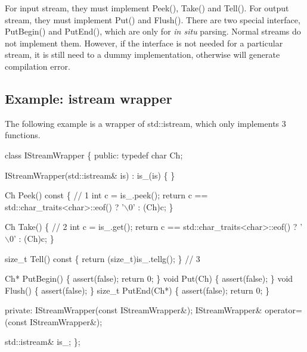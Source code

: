 For input stream, they must implement {\ttfamily Peek()}, {\ttfamily Take()} and {\ttfamily Tell()}. For output stream, they must implement {\ttfamily Put()} and {\ttfamily Flush()}. There are two special interface, {\ttfamily Put\+Begin()} and {\ttfamily Put\+End()}, which are only for {\itshape in situ} parsing. Normal streams do not implement them. However, if the interface is not needed for a particular stream, it is still need to a dummy implementation, otherwise will generate compilation error.\hypertarget{md_Cadriciel_Commun_Externe_RapidJSON_doc_stream.zh-cn_ExampleIStreamWrapper}{}\subsection{Example\+: istream wrapper}\label{md_Cadriciel_Commun_Externe_RapidJSON_doc_stream.zh-cn_ExampleIStreamWrapper}
The following example is a wrapper of {\ttfamily std\+::istream}, which only implements 3 functions.


\begin{DoxyCode}
\textcolor{keyword}{class }IStreamWrapper \{
\textcolor{keyword}{public}:
    \textcolor{keyword}{typedef} \textcolor{keywordtype}{char} Ch;

    IStreamWrapper(std::istream& is) : is\_(is) \{
    \}

    Ch Peek()\textcolor{keyword}{ const }\{ \textcolor{comment}{// 1}
        \textcolor{keywordtype}{int} c = is\_.peek();
        \textcolor{keywordflow}{return} c == std::char\_traits<char>::eof() ? \textcolor{charliteral}{'\(\backslash\)0'} : (Ch)c;
    \}

    Ch Take() \{ \textcolor{comment}{// 2}
        \textcolor{keywordtype}{int} c = is\_.get();
        \textcolor{keywordflow}{return} c == std::char\_traits<char>::eof() ? \textcolor{charliteral}{'\(\backslash\)0'} : (Ch)c;
    \}

    \textcolor{keywordtype}{size\_t} Tell()\textcolor{keyword}{ const }\{ \textcolor{keywordflow}{return} (\textcolor{keywordtype}{size\_t})is\_.tellg(); \} \textcolor{comment}{// 3}

    Ch* PutBegin() \{ assert(\textcolor{keyword}{false}); \textcolor{keywordflow}{return} 0; \}
    \textcolor{keywordtype}{void} Put(Ch) \{ assert(\textcolor{keyword}{false}); \}
    \textcolor{keywordtype}{void} Flush() \{ assert(\textcolor{keyword}{false}); \}
    \textcolor{keywordtype}{size\_t} PutEnd(Ch*) \{ assert(\textcolor{keyword}{false}); \textcolor{keywordflow}{return} 0; \}

\textcolor{keyword}{private}:
    IStreamWrapper(\textcolor{keyword}{const} IStreamWrapper&);
    IStreamWrapper& operator=(\textcolor{keyword}{const} IStreamWrapper&);

    std::istream& is\_;
\};
\end{DoxyCode}



